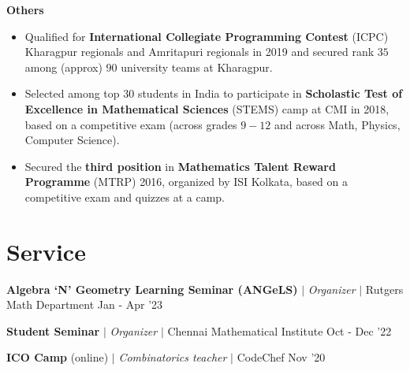 \vspace{-12pt}
\resumeProjectHeading
{\textbf{Others}}
{}
{
\vspace{-13pt}\item 
\begin{itemize}[itemsep=-5pt, parsep=5pt, leftmargin=0.5cm]
\item {}  Qualified for \textbf{International Collegiate Programming Contest} (ICPC) Kharagpur regionals and Amritapuri regionals in 2019 and secured rank $35$ among (approx) $90$ university teams at Kharagpur.
        \item Selected among top $30$ students in India to participate in \textbf{Scholastic Test of Excellence in Mathematical Sciences} (STEMS) camp at CMI in 2018, based on a competitive exam (across grades $9-12$ and across Math, Physics, Computer Science).
        \item Secured the \textbf{third position} in \textbf{Mathematics Talent Reward Programme} (MTRP) 2016, organized by ISI Kolkata, based on a competitive exam and quizzes at a camp.
\end{itemize}}
\resumeSubHeadingListEnd

\vspace{-15pt}








\section{Service}
\resumeSubHeadingListStart



\resumeProjectHeading
{\textbf{Algebra `N' Geometry Learning Seminar (ANGeLS)} $|$ \textit{Organizer} $|$ Rutgers Math Department}
{Jan - Apr '23}
{}
\vspace{-20pt}

\resumeProjectHeading
{\textbf{Student Seminar} $|$ \textit{Organizer} $|$ Chennai Mathematical Institute}
{Oct - Dec '22}
{}
\vspace{-20pt}

\resumeProjectHeading
{\textbf{ICO Camp}  (online) $|$ \textit{Combinatorics teacher} $|$ CodeChef}
{Nov '20}
{}


